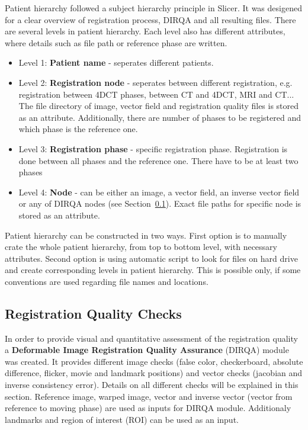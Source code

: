 \documentclass[type=dr, dr=rernat, accentcolor=tud7b,colorbacktitle, bigchapter, openright, twoside, 12pt ]{tudthesis}
\begin{document}
Patient hierarchy followed a subject hierarchy principle in Slicer. It was desigened for a clear overview of registration process, DIRQA and all resulting files. There are several levels in patient hierarchy. Each level also has different attributes,
where details such as file path or reference phase are written.

\begin{itemize}
	\item Level 1: \textbf{Patient name} - seperates different patients.
	\item Level 2: \textbf{Registration node} - seperates between different registration, e.g. registration between 4DCT phases, between CT and 4DCT, MRI and CT... 
	\subitem The file directory of image, vector field and registration quality files is stored as an attribute. Additionally, there are number of phases to be registered and which phase is the reference one.
	\item Level 3: \textbf{Registration phase} - specific registration phase. Registration is done between all phases and the reference one. There have to be at least two phases
	\item Level 4: \textbf{Node} - can be either an image, a vector field, an inverse vector field or any of DIRQA nodes (see Section~\ref{DIRQA}).
	\subitem Exact file paths for specific node is stored as an attribute.
\end{itemize}

Patient hierarchy can be constructed in two ways. First option is to manually crate the whole patient hierarchy, from top to bottom level, with necessary attributes. Second option is using automatic script to look for files on hard drive and create corresponding levels in patient hierarchy. This
is possible only, if some conventions are used regarding file names and locations.

\subsection{Registration Quality Checks}
\label{DIRQA}

In order to provide visual and quantitative assessment of the registration quality a \textbf{Deformable Image Registration Quality Assurance} (DIRQA) module was created. It provides different image checks (false color, checkerboard, absolute difference, flicker, movie and landmark positions) and vector checks (jacobian and inverse consistency error). Details on all different checks will be explained in this section. Reference image, warped image, vector and inverse vector (vector from reference to moving phase) are used as inputs for DIRQA module. Additionaly landmarks and region of interest (ROI) can be used as an input.
\end{document}
